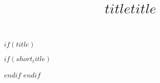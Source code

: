 $if(title)$
  \title{$title$}
  $if(short_title)$
    \title[$short_title$]{$title$}
  $endif$
$endif$